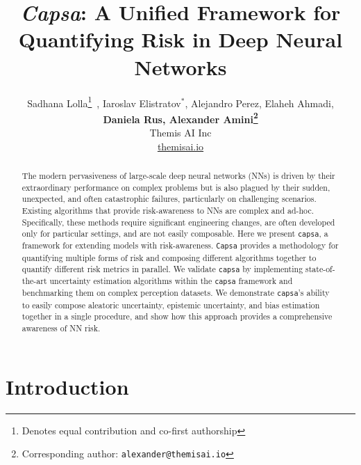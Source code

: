 \documentclass{article} %
\title{\textit{Capsa}: A Unified Framework for Quantifying Risk in Deep Neural Networks}
\author{Sadhana Lolla\thanks{Denotes equal contribution and co-first authorship}~, Iaroslav Elistratov$^*$, Alejandro Perez, Elaheh Ahmadi, \\\textbf{Daniela Rus, Alexander Amini\thanks{Corresponding author: \texttt{alexander@themisai.io}}}
\\
Themis AI Inc\\
\url{themisai.io}\\
}
\def\capsa{\texttt{{capsa}}}
\def\Capsa{\texttt{{Capsa}}}
\begin{document}
\maketitle

\begin{abstract}
The modern pervasiveness of large-scale deep neural networks (NNs) is driven by their extraordinary performance on complex problems but is also plagued by their sudden, unexpected, and often catastrophic failures, particularly on challenging scenarios. 
%
Existing algorithms that provide risk-awareness to NNs are complex and ad-hoc. Specifically, these methods require significant engineering changes, are often developed only for particular settings, and are not easily composable. 
%
Here we present \capsa, a framework for extending models with risk-awareness. \Capsa{} provides a methodology for quantifying multiple forms of risk and composing different algorithms together to quantify different risk metrics in parallel. 
%
We validate \capsa{} by implementing state-of-the-art uncertainty estimation algorithms within the \capsa{} framework and benchmarking them on complex perception datasets. We demonstrate \capsa{}'s ability to easily compose aleatoric uncertainty, epistemic uncertainty, and bias estimation together in a single procedure, and show how this approach provides a comprehensive awareness of NN risk. 
\end{abstract}


\section{Introduction}




\end{document}

